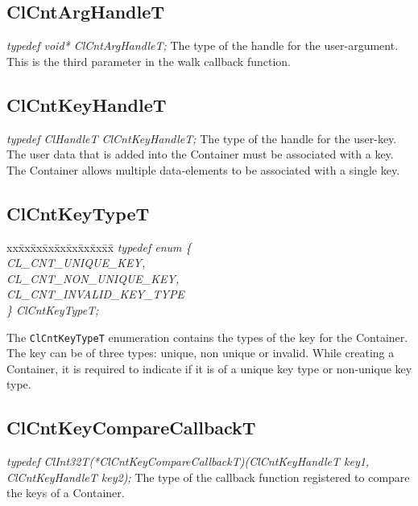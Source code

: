 \subsection{ClCntArgHandleT}
\textit{typedef void* ClCntArgHandleT;}
\newline
\newline
The type of the handle for the user-argument. This is the third parameter in the walk callback function.


\subsection{ClCntKeyHandleT}
\textit{typedef ClHandleT ClCntKeyHandleT;}
\newline
\newline
 The type of the handle for the user-key.
The user data that is added into the Container must be associated with a key. The Container allows multiple data-elements to be associated with a 
single key.


\subsection{ClCntKeyTypeT}
\begin{tabbing}
xx\=xx\=xx\=xx\=xx\=xx\=xx\=xx\=xx\=\kill
\textit{typedef enum \{}\\
\>\>\>\>\textit{CL\_CNT\_UNIQUE\_KEY,}\\
\>\>\>\>\textit{CL\_CNT\_NON\_UNIQUE\_KEY,}\\
\>\>\>\>\textit{CL\_CNT\_INVALID\_KEY\_TYPE}\\
\textit{\} ClCntKeyTypeT;}\end{tabbing}
The {\tt{ClCntKeyTypeT}} enumeration contains the types of the key for the Container. The key can be of three types: 
unique, non unique or invalid. While creating a Container, it is required to indicate if it is of a unique key type or non-unique key type.













\subsection{ClCntKeyCompareCallbackT}
\textit{typedef ClInt32T(*ClCntKeyCompareCallbackT)(ClCntKeyHandleT key1, ClCntKeyHandleT key2);}
\newline
\newline
The type of the callback function registered to compare the keys of a Container.


